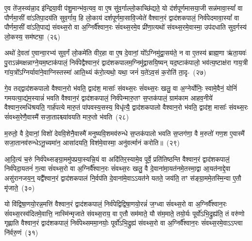 ए॒व ते॑ज॒स्व्य॑न्ना॒द इ॑न्द्रिया॒वी प॑शु॒मान्भ॑व॒त्यव॒ वा ए॒ष सु॑व॒र्गाल्लो॒काच्छि॑द्यते॒ यो द॑र्\mbox{}शपूर्णमासया॒जी सन्न॑मावा॒स्यां᳚ वा पौर्णमा॒सीं वा॑\-ऽतिपा॒दय॑ति सुव॒र्गाय॒ हि लो॒काय॑ दर्\mbox{}श\-पूर्ण\-मा॒सावि॒ज्येते॑ वैश्वान॒रं द्वाद॑श\-कपालं॒ निर्व॑पेदमावा॒स्यां᳚ वा पौर्णमा॒सीं वा॑\-ऽति॒पाद्य॑ संवथ्स॒रो वा अ॒ग्निर्वै᳚श्वान॒रः सं॑वथ्स॒रमे॒व प्री॑णा॒त्यथो॑ संवथ्स॒रमे॒वास्मा॒ उप॑दधाति सुव॒र्गस्य॑ लो॒कस्य॒ सम॑ष्ट्या॒~(२६)\ip

अथो॑ दे॒वता॑ ए॒वान्वा॒रभ्य॑ सुव॒र्गं लो॒कमे॑ति वीर॒हा वा ए॒ष दे॒वानां॒ यो᳚\-ऽग्निमु॑द्वा॒सय॑ते॒ न वा ए॒तस्य॑ ब्राह्म॒णा ऋ॑ता॒यवः॑ पु॒रा\-ऽन्न॑मक्षन्नाग्ने॒यम॒ष्टा\-क॑पालं॒ निर्व॑पेद्वैश्वान॒रं द्वाद॑श\-कपालम॒ग्नि\-मु॑द्वासयि॒ष्यन् यद॒ष्टाक॑पालो॒ भव॑त्य॒ष्टाक्ष॑रा गाय॒त्री गा॑य॒त्रो᳚\-ऽग्निर्यावा॑ने॒वाग्निस्तस्मा॑ आति॒थ्यं क॑रो॒त्यथो॒ यथा॒ जनं॑ य॒ते॑\-ऽव॒सं क॒रोति॑ ता॒दृ-~(२७)\ip

गे॒व तद्द्वाद॑श\-कपालो वैश्वान॒रो भ॑वति॒ द्वाद॑श॒ मासाः᳚ संवथ्स॒रः सं॑वथ्स॒रः खलु॒ वा अ॒ग्नेर्योनिः॒ स्वामे॒वैनं॒ योनिं॑ गमयत्या॒द्य॑म॒स्यान्नं॑ भवति वैश्वान॒रं द्वाद॑श\-कपालं॒ निर्व॑पेन्मारु॒तꣳ स॒प्तक॑पालं॒ ग्राम॑काम आहव॒नीये॑ वैश्वान॒रमधि॑श्रयति॒ गार्\mbox{}ह॑पत्ये मारु॒तं पा॑पवस्य॒सस्य॒ विधृ॑त्यै॒ द्वाद॑श\-कपालो वैश्वान॒रो भ॑वति॒ द्वाद॑श॒ मासाः᳚ संवथ्स॒रः सं॑वथ्स॒रेणै॒वास्मै॑ सजा॒ताꣴश्च्या॑वयति मारु॒तो भ॑वति~(२८)\ip

म॒रुतो॒ वै दे॒वानां॒ विशो॑ देववि॒शेनै॒वास्मै॑ मनुष्यवि॒शमव॑\-रुन्धे स॒प्तक॑पालो भवति स॒प्तग॑णा॒ वै म॒रुतो॑ गण॒श ए॒वास्मै॑ सजा॒तानव॑\-रुन्धे\-ऽनू॒च्यमा॑न॒ आसा॑दयति॒ विश॑मे॒वास्मा॒ अनु॑वर्त्मानं करोति॥~(२९)\ip

{\anuvakamend[{प्र॒जाका॑मः संवथ्स॒रः पु॒नात्ये॒वैनं॑ पू॒तः सम॑ष्ट्यै ता॒दृङ्मा॑रु॒तो भ॑व॒त्येका॒न्नत्रि॒ꣳ॒शच्च॑}]}

आ॒दि॒त्यं च॒रुं निर्व॑पेथ्सङ्ग्रा॒ममु॑पप्रया॒स्यन्नि॒यं वा अदि॑तिर॒स्या\-मे॒व पूर्वे॒ प्रति॑तिष्ठन्ति वैश्वान॒रं द्वाद॑श\-कपालं॒ निर्व॑पेदा॒यतनं॑ ग॒त्वा सं॑वथ्स॒रो वा अ॒ग्निर्वै᳚श्वान॒रः सं॑वथ्स॒रः खलु॒ वै दे॒वाना॑मा॒यत॑नमे॒तस्मा॒द्वा आ॒यत॑नाद्दे॒वा असु॑रानजय॒न्॒ यद्वै᳚श्वान॒रं द्वाद॑श\-कपालं नि॒र्वप॑ति दे॒वाना॑\-मे॒वा\-ऽऽ\-\-यत॑ने यतते॒ जय॑ति॒ तꣳ स॑ङ्ग्रा॒ममे॒तस्मि॒न्वा ए॒तौ मृ॑जाते॒~(३०)\ip

यो वि॑द्विषा॒णयो॒रन्न॒मत्ति॑ वैश्वान॒रं द्वाद॑श\-कपालं॒ निर्व॑पेद्विद्विषा॒\-णयो॒रन्नं॑ ज॒ग्ध्वा सं॑वथ्स॒रो वा अ॒ग्निर्वै᳚श्वान॒रः सं॑वथ्स॒रस्व॑दितमे॒वात्ति॒ नास्मि॑न्मृजाते संवथ्स॒राय॒ वा ए॒तौ सम॑माते॒ यौ स॑म॒माते॒ तयो॒र्यः पूर्वो॑\-ऽभि॒द्रुह्य॑ति॒ तं वरु॑णो गृह्णाति वैश्वान॒रं द्वाद॑श\-कपालं॒ निर्व॑पेथ्सममा॒नयोः॒ पूर्वो॑\-ऽभि॒द्रुह्य॑ संवथ्स॒रो वा अ॒ग्निर्वै᳚श्वान॒रः सं॑वथ्स॒रमे॒वा\-ऽऽ\-प्त्वा नि॑र्वरु॒णं~(३१)\ip

